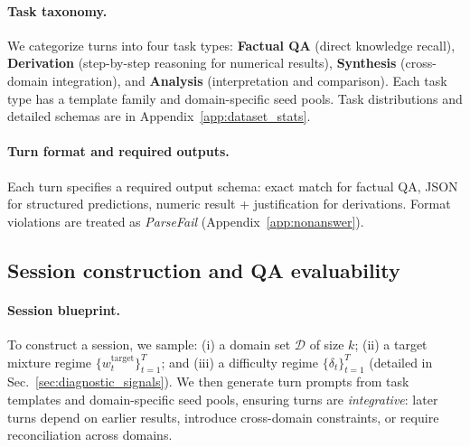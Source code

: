 \paragraph{Task taxonomy.}
We categorize turns into four task types: \textbf{Factual QA} (direct knowledge recall), \textbf{Derivation} (step-by-step reasoning for numerical results), \textbf{Synthesis} (cross-domain integration), and \textbf{Analysis} (interpretation and comparison).
Each task type has a template family and domain-specific seed pools.
Task distributions and detailed schemas are in Appendix~\ref{app:dataset_stats}.



\paragraph{Turn format and required outputs.}
Each turn specifies a required output schema: exact match for factual QA, JSON for structured predictions, numeric result + justification for derivations.
Format violations are treated as \emph{ParseFail} (Appendix~\ref{app:nonanswer}).








\subsection{Session construction and QA evaluability}
\label{sec:episode_construction}

\paragraph{Session blueprint.}
To construct a session, we sample: (i) a domain set $\mathcal{D}$ of size $k$; (ii) a target mixture regime $\{w_t^{\text{target}}\}_{t=1}^{T}$; and (iii) a difficulty regime $\{\delta_t\}_{t=1}^{T}$ (detailed in Sec.~\ref{sec:diagnostic_signals}).
We then generate turn prompts from task templates and domain-specific seed pools, ensuring turns are \emph{integrative}: later turns depend on earlier results, introduce cross-domain constraints, or require reconciliation across domains.

